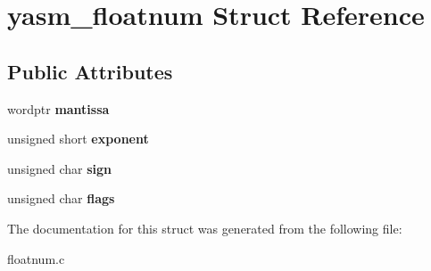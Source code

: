 \hypertarget{structyasm__floatnum}{\section{yasm\-\_\-floatnum Struct Reference}
\label{structyasm__floatnum}
}
\subsection*{Public Attributes}
\begin{DoxyCompactItemize}
\item 
\hypertarget{structyasm__floatnum_a5ebfa3aff03e20cb2db7e50124eb1e89}{wordptr {\bfseries mantissa}}\label{structyasm__floatnum_a5ebfa3aff03e20cb2db7e50124eb1e89}

\item 
\hypertarget{structyasm__floatnum_a6bef0a1e984afe7b5888e0ddc1360060}{unsigned short {\bfseries exponent}}\label{structyasm__floatnum_a6bef0a1e984afe7b5888e0ddc1360060}

\item 
\hypertarget{structyasm__floatnum_a8d78330f710aec3b59763c97b21963d6}{unsigned char {\bfseries sign}}\label{structyasm__floatnum_a8d78330f710aec3b59763c97b21963d6}

\item 
\hypertarget{structyasm__floatnum_a69dd9a24ffd9764015cd258769b9eaac}{unsigned char {\bfseries flags}}\label{structyasm__floatnum_a69dd9a24ffd9764015cd258769b9eaac}

\end{DoxyCompactItemize}


The documentation for this struct was generated from the following file\-:\begin{DoxyCompactItemize}
\item 
floatnum.\-c\end{DoxyCompactItemize}
